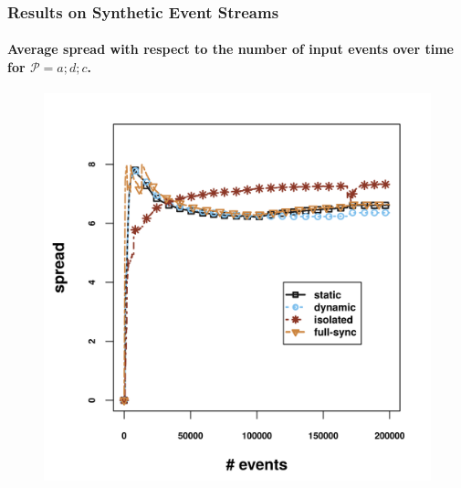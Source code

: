 \begin{frame}
	
	\frametitle{Results on Synthetic Event Streams }
	\framesubtitle{Average spread  with respect to the number of input events over time for $\mathcal{P}=a;d;c$.}
	
\begin{figure}[]
	\centering
	\includegraphics[width=.9\textwidth,height=.8\textheight]{../chapters/figures/synthetic/new/spread_synthetic.png}
	
\end{figure}
	
\end{frame}


